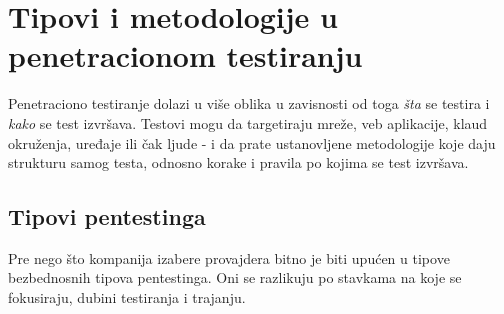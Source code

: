 \documentclass[a4paper,12pt]{article}
\begin{document}
\section{Tipovi i metodologije u penetracionom testiranju}

Penetraciono testiranje dolazi u više oblika u zavisnosti od toga \textit{šta} se testira i \textit{kako} se test izvršava. Testovi mogu da targetiraju mreže, veb aplikacije, klaud okruženja, uređaje ili čak ljude - i da prate ustanovljene metodologije koje daju strukturu samog testa, odnosno korake i pravila po kojima se test izvršava.

\subsection{Tipovi pentestinga}

Pre nego što kompanija izabere provajdera bitno je biti upućen u tipove bezbednosnih tipova pentestinga. Oni se razlikuju po stavkama na koje se fokusiraju, dubini testiranja i trajanju.
\end{document}
